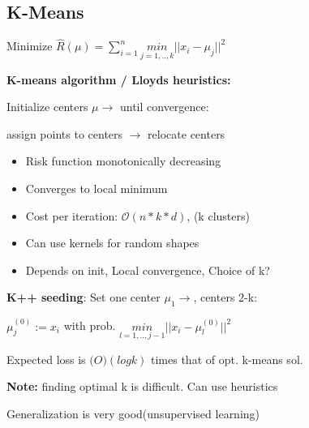 \subsection{K-Means}

\begin{center}
   Minimize $\hat{R}(\mu) = \sum_{i=1}^n \underset{j=1,..,k}{min}||x_i - \mu_j||^2$
\end{center}
\textbf{K-means algorithm / Lloyds heuristics: }

Initialize centers $\mu \rightarrow$ until convergence: 

assign points to centers $\rightarrow$ relocate centers
\begin{itemize}
    \item Risk function monotonically decreasing
    \item Converges to local minimum
    \item Cost per iteration: $\mathcal{O}(n*k*d)$, (k clusters)
    \item Can use kernels for random shapes
    \item \color{Red}Depends on init, Local convergence, Choice of k?\color{black}
\end{itemize}
\textbf{K++ seeding}: Set one center $\mu_1 \rightarrow$, centers 2-k:

\begin{center}
    $\mu_j^{(0)} := x_i$ with prob. $\underset{l=1,..,j-1}{min}||x_i - \mu_l^{(0)}||^2$
\end{center}

Expected loss is $\mathcal(O)(logk)$ times that of opt. k-means sol.

\textbf{Note:} finding optimal k is difficult. Can use heuristics

Generalization is very good(unsupervised learning)